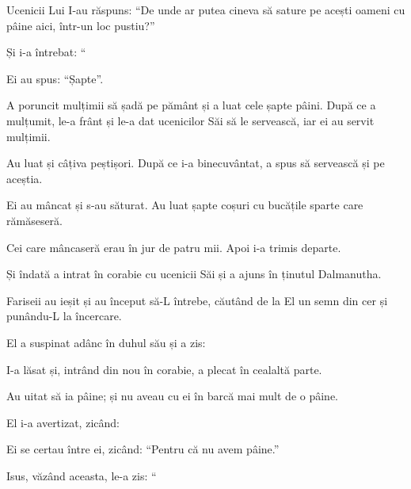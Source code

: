 {\par }{\PP {}Ucenicii Lui I-au răspuns: “De unde ar putea cineva să sature pe acești oameni cu pâine aici, într-un loc pustiu?”


\par }{\PP {}Și i-a întrebat: “{}

\par }{\PP Ei au spus: “Șapte”.


\par }{\PP {}A poruncit mulțimii să șadă pe pământ și a luat cele șapte pâini. După ce a mulțumit, le-a frânt și le-a dat ucenicilor Săi să le servească, iar ei au servit mulțimii.

Au luat și câțiva peștișori. După ce i-a binecuvântat, a spus să servească și pe aceștia.

Ei au mâncat și s-au săturat. Au luat șapte coșuri cu bucățile sparte care rămăseseră.

Cei care mâncaseră erau în jur de patru mii. Apoi i-a trimis departe.


\par }{\PP {}Și îndată a intrat în corabie cu ucenicii Săi și a ajuns în ținutul Dalmanutha.

Fariseii au ieșit și au început să-L întrebe, căutând de la El un semn din cer și punându-L la încercare.

El a suspinat adânc în duhul său și a zis:
{}


\par }{\PP {}I-a lăsat și, intrând din nou în corabie, a plecat în cealaltă parte.

Au uitat să ia pâine; și nu aveau cu ei în barcă mai mult de o pâine.

El i-a avertizat, zicând:
{}


\par }{\PP {}Ei se certau între ei, zicând: “Pentru că nu avem pâine.”


\par }{\PP {}Isus, văzând aceasta, le-a zis: “{}


}
